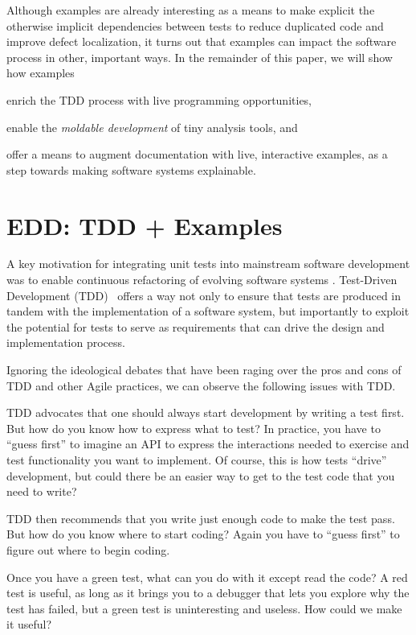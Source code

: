 \documentclass[sigplan,anonymous,review,10pt]{acmart}
\begin{document}
Although examples are already interesting as a means to make explicit the otherwise implicit dependencies between tests to reduce duplicated code and improve defect localization, it turns out that examples can impact the software process in other, important ways.
In the remainder of this paper, we will show how examples
\begin{inparaenum}[(i)]
	\item enrich the TDD process with live programming opportunities,
	\item enable the \emph{moldable development} of tiny analysis tools, and
	\item offer a means to augment documentation with live, interactive examples, as a step towards making software systems explainable.
\end{inparaenum}

\section{EDD: TDD + Examples}\label{sec:edd}

A key motivation for integrating unit tests into mainstream software development was to enable continuous refactoring of evolving software systems \cite{Beck00a}.
Test-Driven Development (TDD)~\cite{Beck03a} offers a way not only to ensure that tests are produced in tandem with the implementation of a software system, but importantly to exploit the potential for tests to serve as requirements that can drive the design and implementation process.

Ignoring the ideological debates that have been raging  over the pros and cons of TDD and other Agile practices, we can observe the following issues with TDD.

\begin{inparaenum}[(i)]
	\item TDD advocates that one should always start development by writing a test first.
But how do you know how to express what to test?
In practice, you have to ``guess first'' to imagine an API to express the interactions needed to exercise and test functionality you want to implement.
Of course, this is how tests ``drive'' development, but could there be an easier way to get to the test code that you need to write?
	\item TDD then recommends that you write just enough code to make the test pass.
But how do you know where to start coding?
Again you have to ``guess first'' to figure out where to begin coding.
	\item Once you have a green test, what can you do with it except read the code?
A red test is useful, as long as it brings you to a debugger that lets you explore why the test has failed, but a green test is uninteresting and useless.
How could we make it useful?
\end{inparaenum}
\end{document}
